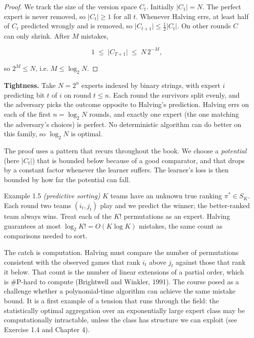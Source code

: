 \documentclass[11pt,a4paper,openany]{book}
\newcommand{\abs}[1]{\lvert #1\rvert}
\begin{document}
\begin{proof}
We track the size of the version space $C_t$. Initially $\abs{C_1}=N$. The perfect expert is never removed, so $\abs{C_t}\ge1$ for all $t$. Whenever Halving errs, at least half of $C_t$ predicted wrongly and is removed, so $\abs{C_{t+1}}\le\tfrac12\abs{C_t}$. On other rounds $C$ can only shrink. After $M$ mistakes,

\[1\;\le\;\abs{C_{T+1}}\;\le\;N\,2^{-M},\]

so $2^M\le N$, i.e. $M\le\log_2 N$.
\end{proof}

\textbf{Tightness.} Take $N=2^n$ experts indexed by binary strings, with expert $i$ predicting bit $t$ of $i$ on round $t\le n$. Each round the survivors split evenly, and the adversary picks the outcome opposite to Halving's prediction. Halving errs on each of the first $n=\log_2N$ rounds, and exactly one expert (the one matching the adversary's choices) is perfect. No deterministic algorithm can do better on this family, so $\log_2 N$ is optimal.

The proof uses a pattern that recurs throughout the book. We choose a \emph{potential} (here $\abs{C_t}$) that is bounded below because of a good comparator, and that drops by a constant factor whenever the learner suffers. The learner's loss is then bounded by how far the potential can fall.

\begin{bexample}{Example 1.5 \emph{(predictive sorting)}}
$K$ teams have an unknown true ranking $\pi^*\in S_K$. Each round two teams $(i_t,j_t)$ play and we predict the winner; the better-ranked team always wins. Treat each of the $K!$ permutations as an expert. Halving guarantees at most $\log_2 K! = O(K\log K)$ mistakes, the same count as comparisons needed to sort.

The catch is computation. Halving must compare the number of permutations consistent with the observed games that rank $i_t$ above $j_t$ against those that rank it below. That count is the number of linear extensions of a partial order, which is \#P-hard to compute (Brightwell and Winkler, 1991). The course posed as a challenge whether a polynomial-time algorithm can achieve the same mistake bound. It is a first example of a tension that runs through the field: the statistically optimal aggregation over an exponentially large expert class may be computationally intractable, unless the class has structure we can exploit (see Exercise 1.4 and Chapter 4).
\end{bexample}
\end{document}

